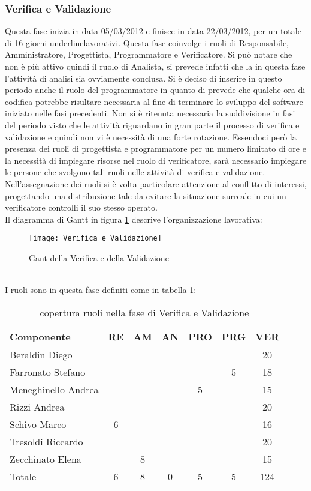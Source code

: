 \subsubsection{Verifica e Validazione}
Questa fase inizia in data 05/03/2012 e finisce in data 22/03/2012, per un totale di 16 giorni underline{lavorativi}.
Questa fase coinvolge i ruoli di Responsabile, Amministratore, Progettista, Programmatore e Verificatore. Si può notare che non è più attivo quindi il ruolo di Analista, si prevede infatti che la in questa fase l’attività di analisi sia ovviamente conclusa.
Si è deciso di inserire  in questo periodo anche il ruolo del programmatore in quanto di prevede che qualche ora di codifica potrebbe risultare necessaria al fine di terminare lo sviluppo del software iniziato nelle fasi precedenti.
Non si è ritenuta necessaria la suddivisione in fasi del periodo visto che le attività riguardano in gran parte il processo di verifica e validazione e quindi non vi è necessità di una forte rotazione.
Essendoci però la presenza dei ruoli di progettista e programmatore per un numero limitato di ore e la necessità di impiegare risorse nel ruolo di verificatore, sarà necessario impiegare le persone che svolgono tali ruoli nelle attività di verifica e validazione.  
Nell’assegnazione dei ruoli si è volta particolare attenzione al conflitto di interessi,  progettando una distribuzione tale da evitare la situazione surreale in cui un verificatore controlli il suo stesso operato.\\
Il diagramma di Gantt in figura \ref{fig:gantvv} descrive l'organizzazione lavorativa:\\
\begin{figure}[h!]
  \texttt{[image: Verifica\_e\_Validazione]}
\caption{Gant della Verifica e della Validazione}\label{fig:gantvv}
\end{figure}\\
I ruoli sono in questa fase definiti come in tabella \ref{tab:ruolivv}:\\
\begin{table}[h!]
\centering
\begin{tabular}{|l|c|c|c|c|c|c|}
\hline
Componente& RE& AM& AN& PRO& PRG& VER\\
\hline
Beraldin Diego & & & & & & 20\\
Farronato Stefano & & & & & 5& 18\\
Meneghinello Andrea & & & & 5& & 15\\
Rizzi Andrea & & & & & & 20\\
Schivo Marco & 6& & & & & 16\\
Tresoldi Riccardo & & & & & & 20\\
Zecchinato Elena & & 8& & & & 15\\
\hline
Totale & 6& 8& 0& 5& 5& 124\\
\hline
\end{tabular}
\caption{copertura ruoli nella fase di Verifica e Validazione}\label{tab:ruolivv}
\end{table}
